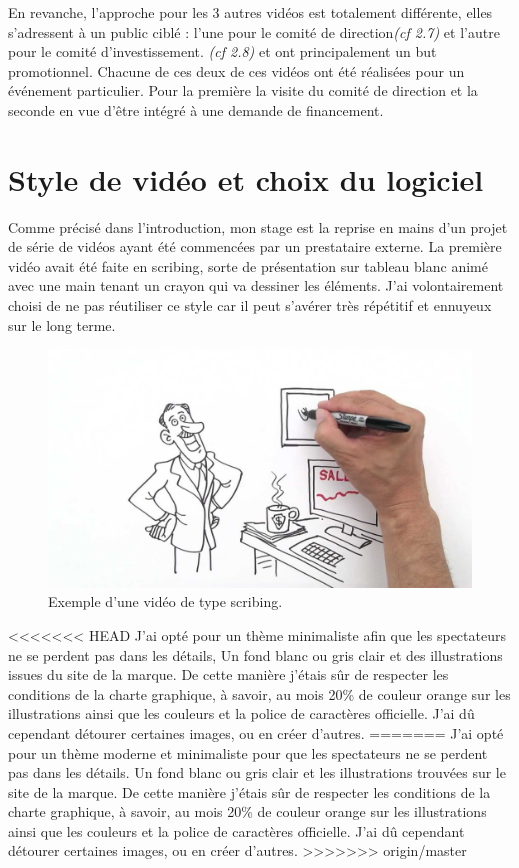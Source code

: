 En revanche, l'approche pour les 3 autres vidéos est totalement différente, elles s'adressent à un public ciblé : l'une pour le comité de direction\textit{(cf 2.7)} et l'autre pour le comité d'investissement. \textit{(cf 2.8)} et ont principalement un but promotionnel. Chacune de ces deux de ces vidéos ont été réalisées pour un événement particulier. Pour la première la visite du comité de direction et la seconde en vue d'être intégré à une demande de financement. \\



\section{Style de vidéo et choix du logiciel}
Comme précisé dans l'introduction, mon stage est la reprise en mains d'un projet de série de vidéos ayant été commencées par un prestataire externe. La première vidéo avait été faite en scribing, sorte de présentation sur tableau blanc animé avec une main tenant un crayon qui va dessiner les éléments. J'ai volontairement choisi de ne pas réutiliser ce style car il peut s'avérer très répétitif et ennuyeux sur le long terme.

\begin{figure}[htp]
  \centering
  \includegraphics[width=15cm]{images/scribe}
  \caption{Exemple d'une vidéo de type scribing.}
  \label{scribe}
\end{figure}

<<<<<<< HEAD
J'ai opté pour un thème minimaliste afin que les spectateurs ne se perdent pas dans les détails, Un fond blanc ou gris clair et des illustrations issues du site de la marque. De cette manière j'étais sûr de respecter les conditions de la charte graphique, à savoir, au mois 20\% de couleur orange sur les illustrations ainsi que les couleurs et la police de caractères officielle. J'ai dû cependant détourer certaines images, ou en créer d'autres.
=======
J'ai opté pour un thème moderne et minimaliste pour que les spectateurs ne se perdent pas dans les détails. Un fond blanc ou gris clair et les illustrations trouvées sur le site de la marque. De cette manière j'étais sûr de respecter les conditions de la charte graphique, à savoir, au mois 20\% de couleur orange sur les illustrations ainsi que les couleurs et la police de caractères officielle. J'ai dû cependant détourer certaines images, ou en créer d'autres.
>>>>>>> origin/master

